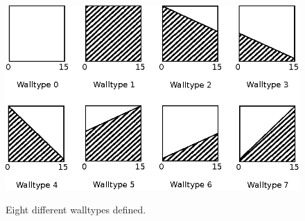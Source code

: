 \documentclass[book.tex]{subfiles}
\begin{document}
\begin{figure}[H]
  \centering
  \includegraphics[width=\textwidth]{imgs/drawings/walltype.eps}
  \label{fig:walltype}
  \caption{Eight different walltypes defined.}
\end{figure}

\begin{minipage}{\textwidth}
  
\end{minipage}
\label{wallclip_array}
\par




\par
\begin{minipage}{\textwidth}
  
\end{minipage}
\label{wallclip_array}
\par
\end{document}
